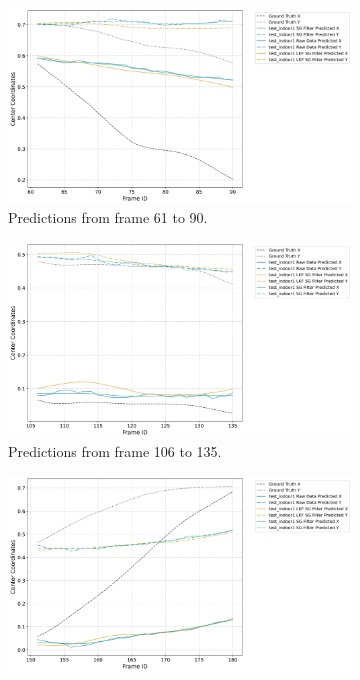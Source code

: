 \documentclass[12pt,oneside]{book} %
\begin{document}
\begin{figure}[H]
    \centering
    \begin{subfigure}[t]{0.8\textwidth}
        \includegraphics[width=\textwidth]{figures/test_indoor1_Group_1_Trajectories.png}
        \caption{Predictions from frame 61 to 90.}
        \label{fig:framework-test_indoor1-1}
    \end{subfigure}
    \hfill
    \begin{subfigure}[t]{0.8\textwidth}
        \includegraphics[width=\textwidth]{figures/test_indoor1_Group_2_Trajectories.png}
        \caption{Predictions from frame 106 to 135.}
        \label{fig:framework-test_indoor1-2}
    \end{subfigure}
    \vfill
    \begin{subfigure}[t]{0.8\textwidth}
        \includegraphics[width=\textwidth]{figures/test_indoor1_Group_3_Trajectories.png}

\end{subfigure}
\end{figure}
\end{document}
